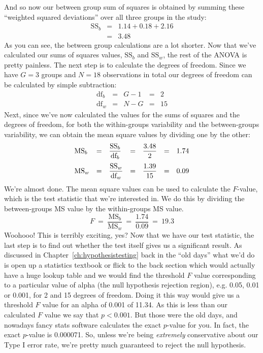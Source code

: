 \noindent
And so now our between group sum of squares is obtained by summing these ``weighted squared deviations'' over all three groups in the study:
$$
\begin{array}{rcl}
\mbox{SS}_{b} &=& 1.14 + 0.18 + 2.16 \\
&=& 3.48
\end{array}
$$
As you can see, the between group calculations are a lot shorter. Now that we've calculated our sums of squares values, $\mbox{SS}_b$ and $\mbox{SS}_w$, the rest of the ANOVA is pretty painless. The next step is to calculate the degrees of freedom. Since we have $G = 3$ groups and $N = 18$ observations in total our degrees of freedom can be calculated by simple subtraction:
$$
\begin{array}{lclcl}
\mbox{df}_b &=& G - 1 &=& 2 \\
\mbox{df}_w &=& N - G &=& 15 
\end{array}
$$
Next, since we've now calculated the values for the sums of squares and the degrees of freedom, for both the within-groups variability and the between-groups variability, we can obtain the mean square values by dividing one by the other:
$$
\begin{array}{lclclcl}
\mbox{MS}_b &=& \displaystyle\frac{\mbox{SS}_b }{  \mbox{df}_b } &=& \displaystyle\frac{3.48}{ 2}  &=& 1.74 \vspace*{6pt} \\ 
\mbox{MS}_w &=& \displaystyle\frac{\mbox{SS}_w }{  \mbox{df}_w } &=& \displaystyle\frac{1.39}{15} &=& 0.09
\end{array}
$$
We're almost done. The mean square values can be used to calculate the $F$-value, which is the test statistic that we're interested in. We do this by dividing the between-groups MS value by the within-groups MS value.
$$
F \ = \ \frac{\mbox{MS}_b }{ \mbox{MS}_w } \ = \ \frac{1.74}{0.09} \ = \ 19.3
$$
Woohooo! This is terribly exciting, yes? Now that we have our test statistic, the last step is to find out whether the test itself gives us a significant result. As discussed in Chapter~\ref{ch:hypothesistesting} back in the ``old days'' what we'd do is open up a statistics textbook or flick to the back section which would actually have a huge lookup table and we would find the threshold $F$ value corresponding to a particular value of alpha (the null hypothesis rejection region), e.g. 0.05, 0.01 or 0.001, for 2 and 15 degrees of freedom. Doing it this way would give us a threshold $F$ value for an alpha of 0.001 of 11.34. As this is less than our calculated $F$ value we say that $p < 0.001$. But those were the old days, and nowadays fancy stats software calculates the exact $p$-value for you. In fact, the exact $p$-value is 0.000071. So, unless we're being {\it extremely} conservative about our Type I error rate, we're pretty much guaranteed to reject the null hypothesis. 

